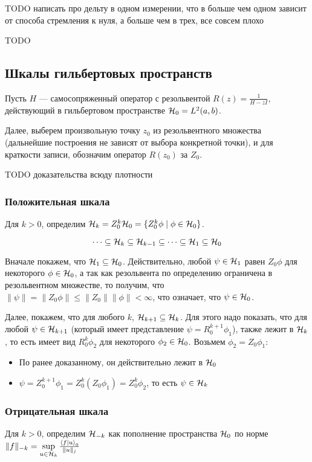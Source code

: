 TODO написать про дельту в одном измерении, что в больше чем одном зависит от способа стремления к нуля, а больше чем в трех, все совсем плохо

TODO
\subsection{Шкалы гильбертовых пространств}
Пусть $H$ — самосопряженный оператор с резольвентой $R(z) = \frac{1}{H - z I}$, действующий в гильбертовом пространстве $\mathcal{H}_{0} = L^2(a, b)$.

Далее, выберем произвольную точку $z_0$ из резольвентного множества (дальнейшие построения не зависят от выбора конкретной точки), и для краткости записи, обозначим оператор $R(z_0)$ за $Z_0$.


TODO доказательства всюду плотности
\subsubsection{Положительная шкала}
Для $k > 0$, определим $\mathcal{H}_{k} = Z_0^k \mathcal{H}_{0} = \{ Z_0^k \phi \mid \phi \in \mathcal{H}_{0} \}$.

\begin{prop}
\[
\dots \subseteq \mathcal{H}_{k} \subseteq \mathcal{H}_{k - 1} \subseteq \dots \subseteq \mathcal{H}_{1} \subseteq{\mathcal{H}_{0}}
\]
\end{prop}
Вначале покажем, что $\mathcal{H}_{1} \subseteq \mathcal{H}_{0}$. Действительно, любой $\psi \in \mathcal{H}_{1}$ равен $Z_0 \phi$ для некоторого $\phi \in \mathcal{H}_{0}$, а так как резольвента по определению ограничена в резольвентном множестве, то получим, что $\| \psi \| = \| Z_0 \phi \| \le \|Z_0\| \|\phi\| < \infty$, что означает, что $\psi \in \mathcal{H}_{0}$.

Далее, покажем, что для любого $k$, $\mathcal{H}_{k + 1} \subseteq \mathcal{H}_{k}$. Для этого надо показать, что для любой $\psi \in \mathcal{H}_{k + 1}$ (который имеет представление $\psi = R_0^{k + 1} \phi_1$), также лежит в $\mathcal{H}_{k}$, то есть имеет вид $R_0^k \phi_2$ для некоторого $\phi_2 \in \mathcal{H}_{0}$. Возьмем $\phi_2 = Z_0 \phi_1$:
\begin{itemize}
\item По ранее доказанному, он действительно лежит в $\mathcal{H}_{0}$
\item $\psi = Z_0^{k + 1} \phi_1 = Z_0^k (Z_0 \phi_1) = Z_0^k \phi_2$, то есть $\psi \in \mathcal{H}_{k}$
\end{itemize}

\subsubsection{Отрицательная шкала}
Для $k > 0$, определим $\mathcal{H}_{-k}$ как пополнение пространства $\mathcal{H}_{0}$ по норме $\|f \|_{-k} = \sup\limits_{u \in \hilb{k}} \frac{\ip{f}{u}_0}{\|u\|_j}$


